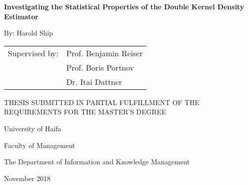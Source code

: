 
\thispagestyle{plain}
\begin{center}
        \large

        \vspace*{0.4cm}

        \textbf{\LARGE Investigating the Statistical Properties of the Double Kernel Density Estimator}

        \vspace*{0.7cm}

        By: Harold Ship

        \vspace*{0.6cm}

        \begin{singlespace}
            \begin{tabular}{rl}
                Supervised by:  & Prof. Benjamin Reiser\\
                                & Prof. Boris Portnov\\
                                & Dr. Itai Dattner
            \end{tabular}
        \end{singlespace}

        \vspace*{1.5cm}

        THESIS SUBMITTED IN PARTIAL FULFILLMENT OF THE REQUIREMENTS FOR THE MASTER'S DEGREE

        \vspace*{1.4cm}

        \begin{onehalfspace}
            University of Haifa\par
            Faculty of Management\par
            The Department of Information and Knowledge Management\par
        \end{onehalfspace}
        
        \vspace*{0.5cm}

        November 2018

        \vspace*{0.7cm}


\end{center}
